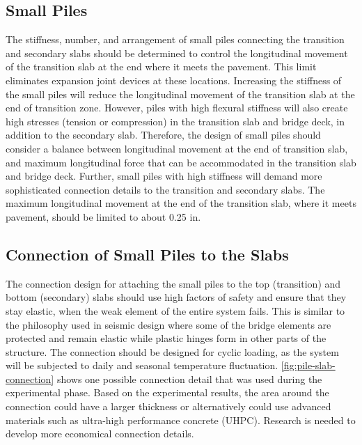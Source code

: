 \subsection{Small Piles}
The stiffness, number, and arrangement of small piles connecting the transition and secondary slabs should be determined to control the longitudinal movement of the transition slab at the end where it meets the pavement. This limit eliminates expansion joint devices at these locations. Increasing the stiffness of the small piles will reduce the longitudinal movement of the transition slab at the end of transition zone. However, piles with high flexural stiffness will also create high stresses (tension or compression) in the transition slab and bridge deck, in addition to the secondary slab. Therefore, the design of small piles should consider a balance between longitudinal movement at the end of transition slab, and maximum longitudinal force that can be accommodated in the transition slab and bridge deck. Further, small piles with high stiffness will demand more sophisticated connection details to the transition and secondary slabs. The maximum longitudinal movement at the end of the transition slab, where it meets pavement, should be limited to about 0.25 in.

\subsection{Connection of Small Piles to the Slabs}
The connection design for attaching the small piles to the top (transition) and bottom (secondary) slabs should use high factors of safety and ensure that they stay elastic, when the weak element of the entire system fails. This is similar to the philosophy used in seismic design where some of the bridge elements are protected and remain elastic while plastic hinges form in other parts of the structure. The connection should be designed for cyclic loading, as the system will be subjected to daily and seasonal temperature fluctuation. \cref{fig:pile-slab-connection} shows one possible connection detail that was used during the experimental phase. Based on the experimental results, the area around the connection could have a larger thickness or alternatively could use advanced materials such as ultra-high performance concrete (UHPC). Research is needed to develop more economical connection details.

